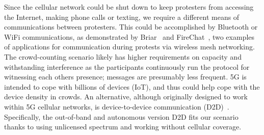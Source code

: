 
Since the cellular network could be shut down to keep protesters from accessing the Internet, making phone calls or texting, we require a different means of communications between protesters. 
This could be accomplished by Bluetooth or WiFi communications, as demonstrated by Briar~\cite{Briar} and FireChat~\cite{FireChat}, two examples of applications for communication during protests via wireless mesh networking. The crowd-counting scenario likely has higher requirements on capacity and withstanding interference as the participants continuously run the protocol for witnessing each others presence; messages are presumably less frequent. 5G is intended to cope with billions of devices (IoT), and thus could help cope with the device density in crowds.
An alternative, although originally designed to work within 5G cellular networks, is device-to-device communication (D2D)~\cite{D2D}. 
Specifically, the out-of-band and autonomous version D2D fits our scenario thanks to using unlicensed spectrum and working without cellular coverage. 